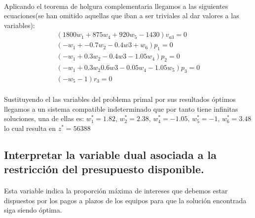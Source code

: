 \documentclass[10pt, a4paper]{article}
\begin{document}
			\paragraph{}
			Aplicando el teorema de holgura complementaria llegamos a las siguientes ecuaciones(se han omitido aquellas que iban a ser triviales al dar valores a las variables):
			\[
			\begin{split}
				(1800w_{1} + 875w_{4} + 920w_{5} - 1430)v_{a3} = 0 \\
				(-w_{1} + -0.7w_{2} -0.4w{3} +w_{6})p_{1} = 0 \\
				(-w_{1} + 0.3w_{2} -0.4w{3} -1.05w_{4})p_{2} = 0 \\
				(-w_{1} + 0.3w_{2} 0.6w{3} -0.05w_{4} -1.05w_{5})p_{3} = 0 \\
				(-w_{5} - 1)r_{3} = 0 \\
			\end{split}
			\]

			Sustituyendo el las variables del problema primal por sus resultados óptimos llegamos a un sistema compatible indeterminado que por tanto tiene infinitas soluciones, una de ellas es: \(w_{1}^{*} = 1.82 \), \(w_{2}^{*} = 2.38 \), \(w_{4}^{*} = -1.05 \), \(w_{5}^{*} = -1 \), \(w_{6}^{*} = 3.48 \)lo cual resulta en \(z^{*} = 56388\)


		\subsection{Interpretar la variable dual asociada a la restricción del presupuesto disponible.}

			\paragraph{}
			Esta variable indica la proporción máxima de intereses que debemos estar dispuestos por los pagos a plazos de los equipos para que la solución encontrada siga siendo óptima.
\end{document}
